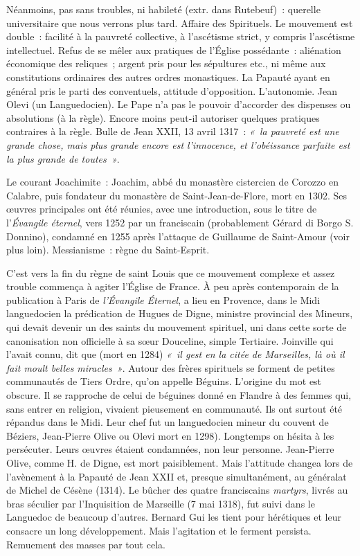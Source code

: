 \documentclass[french,twoside]{book} %
\def\mednobreak{\ifdim\lastskip<\medskipamount
  \removelastskip\nopagebreak\medskip\fi}
\newcommand{\labelblock}[1]{\medbreak{\noindent\color{rubric}\bfseries #1}\par\mednobreak}
\begin{document}
\labelblock{Les Tiers Ordres.}

\noindent Néanmoins, pas sans troubles, ni habileté (extr. dans Rutebeuf) : querelle universitaire que nous verrons plus tard. Affaire des Spirituels. Le mouvement est double : facilité à la pauvreté collective, à l’ascétisme strict, y compris l’ascétisme intellectuel. Refus de se mêler aux pratiques de l’Église possédante : aliénation  
\label{p112} économique des reliques ; argent pris pour les sépultures etc., ni même aux constitutions ordinaires des autres ordres monastiques. La Papauté ayant en général pris le parti des conventuels, attitude d’opposition. L’autonomie. Jean Olevi (un Languedocien). Le Pape n’a pas le pouvoir d’accorder des dispenses ou absolutions (à la règle). Encore moins peut-il autoriser quelques pratiques contraires à la règle. Bulle de Jean XXII, 13 avril 1317 : \emph{« la pauvreté est une grande chose, mais plus grande encore est l’innocence, et l’obéissance parfaite est la plus grande de toutes »}.\par
Le courant Joachimite : Joachim, abbé du monastère cistercien de Corozzo en Calabre, puis fondateur du monastère de Saint-Jean-de-Flore, mort en 1302. Ses œuvres principales ont été réunies, avec une introduction, sous le titre de l’{\itshape Évangile éternel}, vers 1252 par un franciscain (probablement Gérard di Borgo S. Donnino), condamné en 1255 après l’attaque de Guillaume de Saint-Amour (voir plus loin). Messianisme : règne du Saint-Esprit.\par
C’est vers la fin du règne de saint Louis que ce mouvement complexe et assez trouble commença à agiter l’Église de France. À peu après contemporain de la publication à Paris de \emph{l’Évangile Éternel}, a lieu en Provence, dans le Midi languedocien la prédication de Hugues de Digne, ministre provincial des Mineurs, qui devait devenir un des saints du mouvement spirituel, uni dans cette sorte de canonisation non officielle à sa sœur Douceline, simple Tertiaire. Joinville qui l’avait connu, dit que (mort en 1284) \emph{« il gest en la citée de Marseilles, là où il fait moult belles miracles »}. Autour des frères spirituels se forment de petites communautés de Tiers Ordre, qu’on appelle Béguins. L’origine du mot est obscure. Il se rapproche de celui de béguines donné en Flandre à des femmes qui, sans entrer en religion, vivaient pieusement en communauté. Ils ont surtout été répandus dans le Midi. Leur chef fut un languedocien mineur du couvent de Béziers, Jean-Pierre Olive ou Olevi mort en 1298). Longtemps on hésita à les persécuter. Leurs œuvres étaient condamnées, non leur personne. Jean-Pierre Olive, comme H. de Digne, est mort paisiblement. Mais l’attitude changea lors de l’avènement à la Papauté de Jean XXII et, presque simultanément, au généralat de Michel de Césène (1314). Le bûcher des quatre franciscains \emph{martyrs}, livrés au bras séculier par l’Inquisition de Marseille (7 mai 1318), fut suivi dans le Languedoc de beaucoup d’autres. Bernard Gui les tient pour hérétiques et leur consacre un long développement. Mais l’agitation et le ferment persista. Remuement des masses par tout cela.
\end{document}
